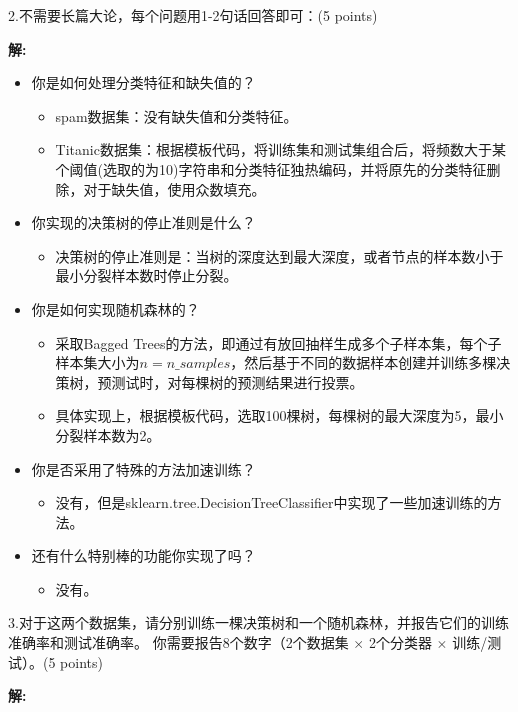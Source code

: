 \documentclass[8pt]{article}
\begin{document}
2.不需要长篇大论，每个问题用1-2句话回答即可：(5 points)

\textbf{\large 解:}

\begin{itemize}
\item 你是如何处理分类特征和缺失值的？
    \begin{itemize}
        \item spam数据集：没有缺失值和分类特征。
        \item Titanic数据集：根据模板代码，将训练集和测试集组合后，将频数大于某个阈值(选取的为10)字符串和分类特征独热编码，并将原先的分类特征删除，对于缺失值，使用众数填充。
    \end{itemize}
\item 你实现的决策树的停止准则是什么？
    \begin{itemize}
        \item 决策树的停止准则是：当树的深度达到最大深度，或者节点的样本数小于最小分裂样本数时停止分裂。
    \end{itemize}
\item 你是如何实现随机森林的？
    \begin{itemize}
        \item 采取Bagged Trees的方法，即通过有放回抽样生成多个子样本集，每个子样本集大小为$n = n\_samples$，然后基于不同的数据样本创建并训练多棵决策树，预测试时，对每棵树的预测结果进行投票。
        \item 具体实现上，根据模板代码，选取100棵树，每棵树的最大深度为5，最小分裂样本数为2。
    \end{itemize}
\item 你是否采用了特殊的方法加速训练？
    \begin{itemize}
        \item 没有，但是sklearn.tree.DecisionTreeClassifier中实现了一些加速训练的方法。
    \end{itemize}
\item 还有什么特别棒的功能你实现了吗？
    \begin{itemize}
        \item 没有。
    \end{itemize}
\end{itemize}

\vspace{3em}

3.对于这两个数据集，请分别训练一棵决策树和一个随机森林，并报告它们的训练准确率和测试准确率。  
你需要报告8个数字（2个数据集 $\times$ 2个分类器 $\times$ 训练/测试）。(5 points)

\textbf{\large 解:}
\end{document}
